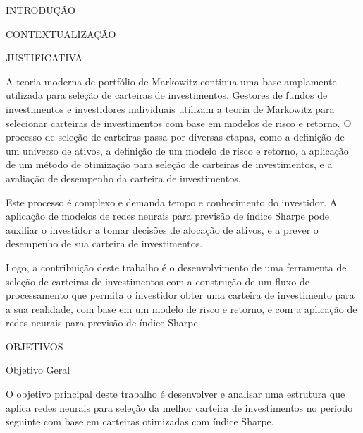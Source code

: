 \begin{section}{INTRODUÇÃO}
\begin{subsection}{CONTEXTUALIZAÇÃO}
    \end{subsection}

    \begin{subsection}{JUSTIFICATIVA}
        
        \ipar A teoria moderna de portfólio de Markowitz continua uma base amplamente utilizada para seleção de carteiras de investimentos. Gestores de fundos de investimentos e investidores individuais utilizam a teoria de Markowitz para selecionar carteiras de investimentos com base em modelos de risco e retorno. O processo de seleção de carteiras passa por diversas etapas, como a definição de um universo de ativos, a definição de um modelo de risco e retorno, a aplicação de um método de otimização para seleção de carteiras de investimentos, e a avaliação de desempenho da carteira de investimentos.

        \ipar Este processo é complexo e demanda tempo e conhecimento do investidor. A aplicação de modelos de redes neurais para previsão de índice Sharpe pode auxiliar o investidor a tomar decisões de alocação de ativos, e a prever o desempenho de sua carteira de investimentos. 

        \ipar Logo, a contribuição deste trabalho é o desenvolvimento de uma ferramenta de seleção de carteiras de investimentos com a construção de um fluxo de processamento que permita o investidor obter uma carteira de investimento para a sua realidade, com base em um modelo de risco e retorno, e com a aplicação de redes neurais para previsão de índice Sharpe. 

    \end{subsection}

    \begin{subsection}{OBJETIVOS}

        \begin{subsubsection}{Objetivo Geral}

            \ipar O objetivo principal deste trabalho é desenvolver e analisar uma estrutura que aplica redes neurais para seleção da melhor carteira de investimentos no período seguinte com base em carteiras otimizadas com índice Sharpe.

        \end{subsubsection}


\end{subsection}
\end{section}
